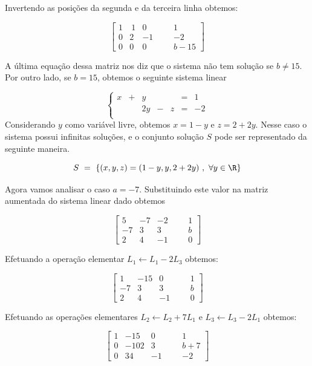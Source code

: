 \begin{solution}
Invertendo as posições da segunda e da terceira linha obtemos:

$$ \left[\begin{array}{rrrr|rc}
  1  & \ 1  &   0   & & &   1    \\
  0  &   2  &  -1   & & &  -2  \\ 
  0  &   0  &   0   & & &   b-15     \end{array}\right] $$

A última equação dessa matriz nos diz que o sistema não tem solução se $b \neq 15$.
Por outro lado, se $b=15$, obtemos o seguinte sistema linear

$$\left\{\begin{array}{rrrrrrr}
 x & + &  y &   &     & = &  1\\
   &   & 2y & - &   z & = & -2\\  \end{array} \right.$$\noindent Considerando $y$ como variável livre, obtemos $x=1-y$ e $z=2+2y$. Nesse caso o sistema possui infinitas soluções, e o conjunto solução $S$ pode ser representado da seguinte maneira.

$$S\ =\ \left\{ (x,y,z) = (1-y, y , 2+2y)\ ,\ \forall y \in \R \right\} $$

\bigskip
Agora vamos analisar o caso $a=-7$. Substituindo este valor na matriz aumentada do sistema linear dado obtemos

$$ \left[\begin{array}{rrrr|rr}
  5 &  -7 &   -2 & & &   1  \\
 -7 &   3 &    3 & & &   b  \\ 
  2 &   4 &   -1 & & &   0  \end{array}\right] $$

Efetuando a operação elementar $L_1 \leftarrow L_1 - 2L_3$ obtemos:

$$ \left[\begin{array}{rrrr|rr}
  1 &  -15 &    0  & & &   1  \\
 -7 &    3 &    3  & & &   b  \\ 
  2 &    4 &   -1  & & &   0  \end{array}\right] $$

Efetuando as operações elementares $L_2 \leftarrow L_2 + 7L_1$  e  $L_3 \leftarrow L_3 - 2L_1$ obtemos:

$$ \left[\begin{array}{rrrr|rc}
  1 &   -15  &    0  & & &   1    \\
  0 &  -102  &    3  & & &   b+7  \\ 
  0 &    34  &   -1  & & &   -2   \end{array}\right] $$


\end{solution}
